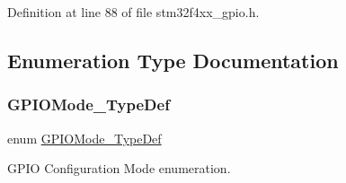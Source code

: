 Definition at line 88 of file stm32f4xx\+\_\+gpio.\+h.



\subsection{Enumeration Type Documentation}
\mbox{\label{group___g_p_i_o_ga1347339e1c84a196fabbb31205eec5d4}} 
\subsubsection{\texorpdfstring{G\+P\+I\+O\+Mode\+\_\+\+Type\+Def}{GPIOMode\_TypeDef}}
{\footnotesize\ttfamily enum \hyperlink{group___g_p_i_o_ga1347339e1c84a196fabbb31205eec5d4}{G\+P\+I\+O\+Mode\+\_\+\+Type\+Def}}



G\+P\+IO Configuration Mode enumeration. 

